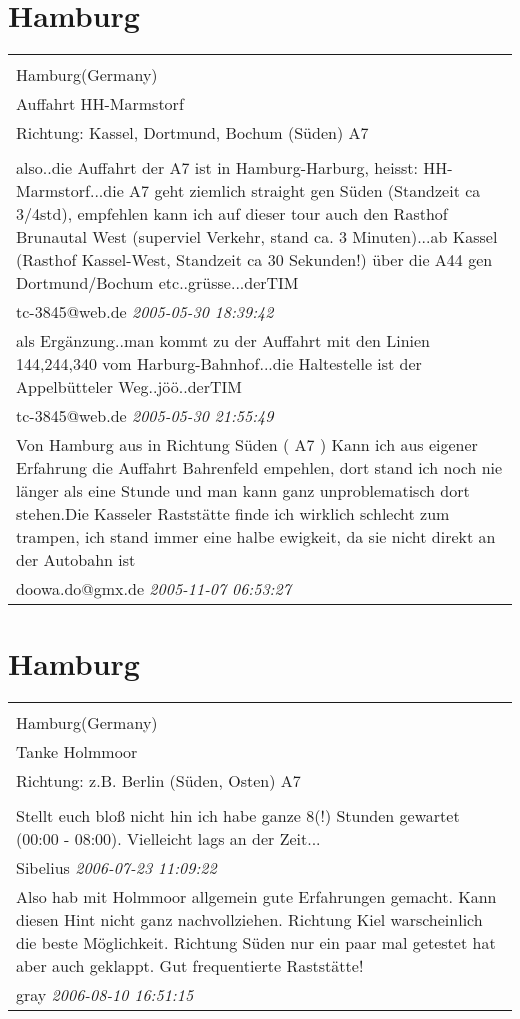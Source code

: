 \documentclass[a4paper,12pt]{article}
\begin{document}
\section{Hamburg}
\begin{tabular}{|p{13cm}|}
\hline\\
Hamburg(Germany)\\
Auffahrt HH-Marmstorf\\
Richtung: Kassel, Dortmund, Bochum (Süden) A7 \\
\hline\\
also..die Auffahrt der A7 ist in Hamburg-Harburg, heisst: HH-Marmstorf...die A7 geht ziemlich straight gen Süden (Standzeit ca 3/4std), empfehlen kann ich auf dieser tour auch den Rasthof Brunautal West (superviel Verkehr, stand ca. 3 Minuten)...ab Kassel (Rasthof Kassel-West, Standzeit ca 30 Sekunden!) über die A44 gen Dortmund/Bochum etc..grüsse...derTIM \\
tc-3845@web.de \textit{ 2005-05-30 18:39:42 }\\\hline als Ergänzung..man kommt zu der Auffahrt mit den Linien 144,244,340 vom Harburg-Bahnhof...die Haltestelle ist der Appelbütteler Weg..jöö..derTIM \\
tc-3845@web.de \textit{ 2005-05-30 21:55:49 }\\\hline Von Hamburg aus in Richtung Süden ( A7 ) Kann ich aus eigener Erfahrung die Auffahrt Bahrenfeld empehlen, dort stand ich noch nie länger als eine Stunde und man kann ganz unproblematisch dort stehen.Die Kasseler Raststätte finde ich wirklich schlecht zum trampen, ich stand immer eine halbe ewigkeit, da sie nicht direkt an der Autobahn ist \\
doowa.do@gmx.de \textit{ 2005-11-07 06:53:27 }\\\hline
\end{tabular}


\section{Hamburg}
\begin{tabular}{|p{13cm}|}
\hline\\
Hamburg(Germany)\\
Tanke Holmmoor\\
Richtung: z.B. Berlin (Süden, Osten) A7 \\
\hline\\
Stellt euch bloß nicht hin ich habe ganze 8(!) Stunden gewartet (00:00 - 08:00). Vielleicht lags an der Zeit... \\
Sibelius \textit{ 2006-07-23 11:09:22 }\\\hline Also hab mit Holmmoor allgemein gute Erfahrungen gemacht. Kann diesen Hint nicht ganz nachvollziehen. Richtung Kiel warscheinlich die beste Möglichkeit. Richtung Süden nur ein paar mal getestet hat aber auch geklappt. Gut frequentierte Raststätte! \\
gray \textit{ 2006-08-10 16:51:15 }\\\hline
\end{tabular}
\end{document}
